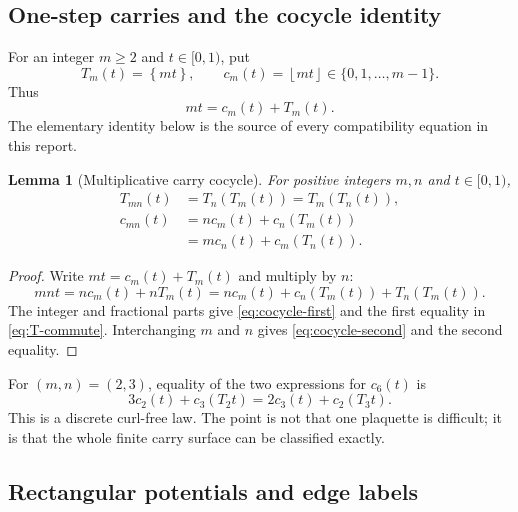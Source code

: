 \documentclass[11pt]{article}
\newtheorem{lemma}[theorem]{Lemma}
\theoremstyle{definition}
\theoremstyle{remark}
\newcommand{\fract}[1]{\left\{#1\right\}}
\newcommand{\floor}[1]{\left\lfloor#1\right\rfloor}
\begin{document}
\subsection{One-step carries and the cocycle identity}

For an integer $m\ge2$ and $t\in[0,1)$, put
\begin{equation}\label{eq:carry-map}
 T_m(t)=\fract{mt},
 \qquad
 c_m(t)=\floor{mt}\in\{0,1,\ldots,m-1\}.
\end{equation}
Thus
\begin{equation}\label{eq:one-step-decomposition}
 mt=c_m(t)+T_m(t).
\end{equation}
The elementary identity below is the source of every compatibility equation in this
report.

\begin{lemma}[Multiplicative carry cocycle]\label{lem:carry-cocycle}
For positive integers $m,n$ and $t\in[0,1)$,
\begin{align}
 T_{mn}(t)&=T_n(T_m(t))=T_m(T_n(t)),\label{eq:T-commute}\\
 c_{mn}(t)&=n c_m(t)+c_n(T_m(t))\label{eq:cocycle-first}\\
 &=m c_n(t)+c_m(T_n(t)).\label{eq:cocycle-second}
\end{align}
\end{lemma}

\begin{proof}
Write $mt=c_m(t)+T_m(t)$ and multiply by $n$:
\[
 mnt=n c_m(t)+nT_m(t)
     =n c_m(t)+c_n(T_m(t))+T_n(T_m(t)).
\]
The integer and fractional parts give \eqref{eq:cocycle-first} and the first equality
in \eqref{eq:T-commute}.  Interchanging $m$ and $n$ gives
\eqref{eq:cocycle-second} and the second equality.
\end{proof}

For $(m,n)=(2,3)$, equality of the two expressions for $c_6(t)$ is
\begin{equation}\label{eq:single-plaquette}
 3c_2(t)+c_3(T_2t)=2c_3(t)+c_2(T_3t).
\end{equation}
This is a discrete curl-free law.  The point is not that one plaquette is difficult;
it is that the whole finite carry surface can be classified exactly.

\subsection{Rectangular potentials and edge labels}
\end{document}
